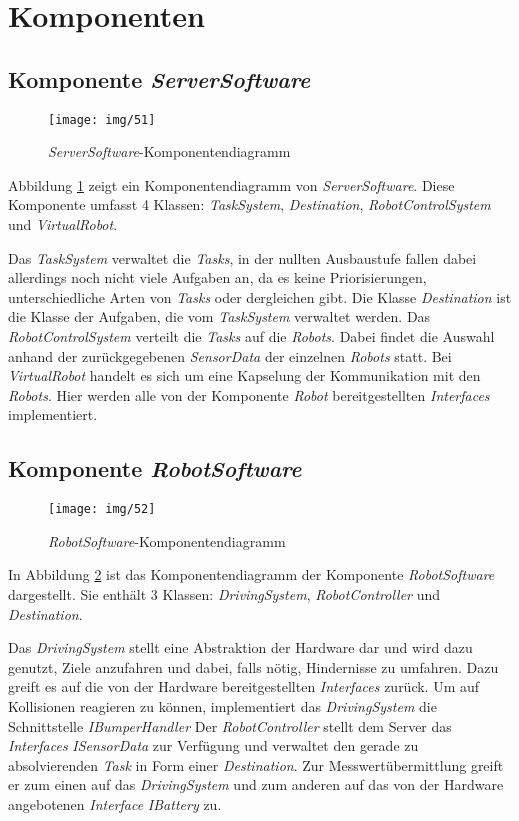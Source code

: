 \section{Komponenten}

\subsection{Komponente \textit{ServerSoftware}}
\begin{figure}[H]
\centering
\texttt{[image: img/51]}
\caption{\emph{ServerSoftware}-Komponentendiagramm}
\label{KomponentenStruktur1}
\end{figure}
Abbildung \ref{KomponentenStruktur1} zeigt ein Komponentendiagramm von \emph{ServerSoftware}. Diese Komponente umfasst 4 Klassen: \textit{TaskSystem}, \textit{Destination}, \textit{RobotControlSystem} und \textit{VirtualRobot}.


Das \textit{TaskSystem} verwaltet die \textit{Tasks}, in der nullten Ausbaustufe fallen dabei allerdings noch nicht viele Aufgaben an, 
da es keine Priorisierungen, unterschiedliche Arten von \textit{Tasks} oder dergleichen gibt. Die Klasse \textit{Destination} ist die Klasse 
der Aufgaben, die vom \textit{TaskSystem} verwaltet werden. Das \textit{RobotControlSystem} verteilt die \textit{Tasks} auf die \textit{Robots}. 
Dabei findet die Auswahl anhand der zurückgegebenen \textit{SensorData} der einzelnen \textit{Robots} statt. Bei \textit{VirtualRobot} handelt 
es sich um eine Kapselung der Kommunikation mit den \textit{Robots}. Hier werden alle von der Komponente \textit{Robot} bereitgestellten 
\textit{Interfaces} implementiert.
\subsection{Komponente \textit{RobotSoftware}}
\begin{figure}[H]
\centering
\texttt{[image: img/52]}
\caption{\emph{RobotSoftware}-Komponentendiagramm}
\label{KomponentenStruktur2}
\end{figure}
In Abbildung \ref{KomponentenStruktur2} ist das Komponentendiagramm der Komponente \textit{RobotSoftware} dargestellt. Sie enthält 3 Klassen: \textit{DrivingSystem}, \textit{RobotController} und \textit{Destination}. 


Das \textit{DrivingSystem} stellt eine Abstraktion der Hardware dar und wird dazu genutzt, Ziele anzufahren und dabei, 
falls nötig, Hindernisse zu umfahren. Dazu greift es auf die von der Hardware bereitgestellten \textit{Interfaces} zurück. 
Um auf Kollisionen reagieren zu können, implementiert das \textit{DrivingSystem} die Schnittstelle \textit{IBumperHandler}
Der \textit{RobotController} stellt dem Server das \emph{Interfaces} \textit{ISensorData} zur Verfügung und verwaltet den gerade 
zu absolvierenden \emph{Task} in Form einer \textit{Destination}. Zur Messwertübermittlung greift er zum einen auf das \textit{DrivingSystem} und zum anderen auf das 
von der Hardware angebotenen \textit{Interface} \textit{IBattery} zu.

